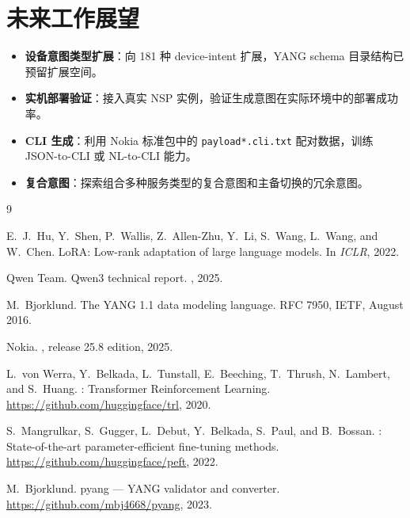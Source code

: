 \documentclass[12pt, a4paper]{article}
\newcommand{\yang}{\textsc{YANG}}
\newcommand{\nsp}{\textsc{NSP}}
\begin{document}
\section{未来工作展望}

\begin{itemize}
  \item \textbf{设备意图类型扩展}：向 181 种 device-intent 扩展，\yang{} schema 目录结构已预留扩展空间。
  \item \textbf{实机部署验证}：接入真实 \nsp{} 实例，验证生成意图在实际环境中的部署成功率。
  \item \textbf{CLI 生成}：利用 Nokia 标准包中的 \texttt{payload*.cli.txt} 配对数据，训练 JSON-to-CLI 或 NL-to-CLI 能力。
  \item \textbf{复合意图}：探索组合多种服务类型的复合意图和主备切换的冗余意图。
\end{itemize}


\begin{thebibliography}{9}

E.~J.~Hu, Y.~Shen, P.~Wallis, Z.~Allen-Zhu, Y.~Li, S.~Wang, L.~Wang, and
  W.~Chen.
\newblock Lo{RA}: Low-rank adaptation of large language models.
\newblock In {\em ICLR}, 2022.

Qwen Team.
\newblock Qwen3 technical report.
, 2025.

M.~Bjorklund.
\newblock The {YANG} 1.1 data modeling language.
\newblock RFC 7950, IETF, August 2016.

Nokia.
, release
  25.8 edition, 2025.

L.~von Werra, Y.~Belkada, L.~Tunstall, E.~Beeching, T.~Thrush, N.~Lambert,
  and S.~Huang.
: Transformer Reinforcement Learning.
\newblock \url{https://github.com/huggingface/trl}, 2020.

S.~Mangrulkar, S.~Gugger, L.~Debut, Y.~Belkada, S.~Paul, and B.~Bossan.
: State-of-the-art parameter-efficient fine-tuning methods.
\newblock \url{https://github.com/huggingface/peft}, 2022.

M.~Bjorklund.
\newblock pyang --- {YANG} validator and converter.
\newblock \url{https://github.com/mbj4668/pyang}, 2023.

\end{thebibliography}
\end{document}
